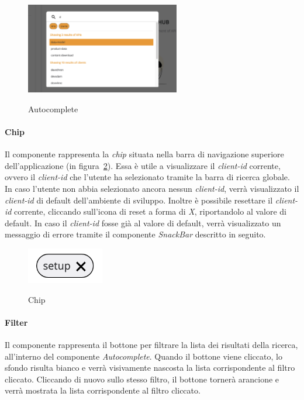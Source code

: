 \begin{figure}[ht]
  \centering
  \includegraphics[width=0.6\textwidth, alt={Componente che si occupa della lista dinamica di risultati}]{images/frontend/SearchBar2.jpg}
  \caption{Autocomplete}\label{fig:autocomplete}
\end{figure}

\paragraph{Chip}\label{par:chip}
Il componente rappresenta la \textit{chip} situata nella barra di navigazione superiore dell'applicazione (in figura~\ref{fig:chip}).
Essa è utile a visualizzare il \textit{client-id} corrente, ovvero il \textit{client-id} che l'utente ha selezionato tramite la barra di ricerca globale.
In caso l'utente non abbia selezionato ancora nessun \textit{client-id}, verrà visualizzato il \textit{client-id} di default dell'ambiente di sviluppo.
Inoltre è possibile resettare il \textit{client-id} corrente, cliccando sull'icona di reset a forma di \textit{X}, riportandolo al valore di default.
In caso il \textit{client-id} fosse già al valore di default, verrà visualizzato un messaggio di errore tramite il componente \textit{SnackBar} descritto in seguito.

\begin{figure}[ht]
  \centering
  \includegraphics[width=0.3\textwidth, alt={Chip contenente il client id corrente}]{images/frontend/Chip.jpg}
  \caption{Chip}\label{fig:chip}
\end{figure}


\paragraph{Filter}\label{par:filter}
Il componente rappresenta il bottone per filtrare la lista dei risultati della ricerca, all'interno del componente \textit{Autocomplete}.
Quando il bottone viene cliccato, lo sfondo risulta bianco e verrà visivamente nascosta la lista corrispondente al filtro cliccato.
Cliccando di nuovo sullo stesso filtro, il bottone tornerà arancione e verrà  mostrata la lista corrispondente al filtro cliccato.


